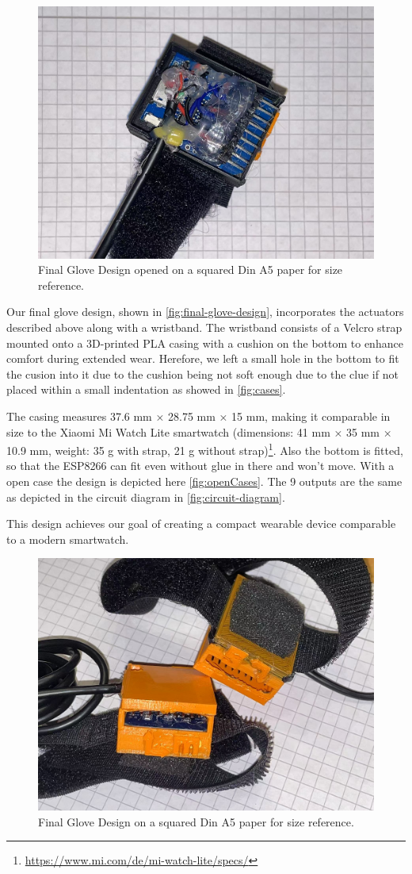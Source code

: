 \begin{figure}
    \centering
    \includegraphics[width=0.5\linewidth]{src/pictures/GloveDesigns/openCase.jpg}
    \caption{Final Glove Design opened on a squared Din A5 paper for size reference.}
    \label{fig:openCases}
\end{figure}

Our final glove design, shown in \autoref{fig:final-glove-design}, incorporates the actuators described above along with a wristband. The wristband consists of a Velcro strap mounted onto a 3D-printed PLA casing with a cushion on the bottom to enhance comfort during extended wear. Herefore, we left a small hole in the bottom to fit the cusion into it due to the cushion being not soft enough due to the clue if not placed within a small indentation as showed in \autoref{fig:cases}.

The casing measures 37.6 mm × 28.75 mm × 15 mm, making it comparable in size to the Xiaomi Mi Watch Lite smartwatch (dimensions: 41 mm × 35 mm × 10.9 mm, weight: 35 g with strap, 21 g without strap)\footnote{\url{https://www.mi.com/de/mi-watch-lite/specs/}}. Also the bottom is fitted, so that the ESP8266 can fit even without glue in there and won't move.
With a open case the design is depicted here \autoref{fig:openCases}. The 9 outputs are the same as depicted in the circuit diagram in \autoref{fig:circuit-diagram}.

This design achieves our goal of creating a compact wearable device comparable to a modern smartwatch.



\begin{figure}
    \centering
    \includegraphics[width=0.5\linewidth]{src/pictures/GloveDesigns/casesFinished.jpg}
    \caption{Final Glove Design on a squared Din A5 paper for size reference.}
    \label{fig:final-glove-design}
\end{figure}


